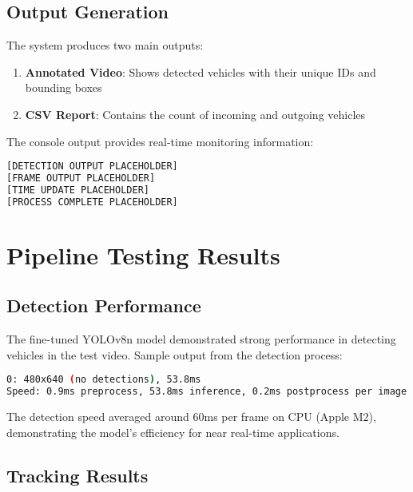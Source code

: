 \documentclass[9pt,a4paper,twoside]{rho-class/rho}
\begin{document}
    \subsection{Output Generation}
    
    The system produces two main outputs:
    
    \begin{enumerate}
        \item \textbf{Annotated Video}: Shows detected vehicles with their unique IDs and bounding boxes
        \item \textbf{CSV Report}: Contains the count of incoming and outgoing vehicles
    \end{enumerate}
    
    The console output provides real-time monitoring information:
    
    \begin{lstlisting}[caption=Console output format, language=bash]
[DETECTION OUTPUT PLACEHOLDER]
[FRAME OUTPUT PLACEHOLDER]
[TIME UPDATE PLACEHOLDER]
[PROCESS COMPLETE PLACEHOLDER]
    \end{lstlisting}

\section{Pipeline Testing Results}

    \subsection{Detection Performance}
    
    The fine-tuned YOLOv8n model demonstrated strong performance in detecting vehicles in the test video. Sample output from the detection process:
    
    \begin{lstlisting}[caption=Detection performance example, language=bash]
0: 480x640 (no detections), 53.8ms
Speed: 0.9ms preprocess, 53.8ms inference, 0.2ms postprocess per image at shape (1, 3, 480, 640)
\end{lstlisting}
    
    The detection speed averaged around 60ms per frame on CPU (Apple M2), demonstrating the model's efficiency for near real-time applications.
    
    \subsection{Tracking Results}
    
\end{document}
